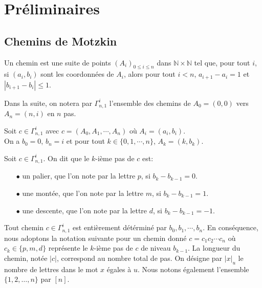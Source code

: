 \chapter{Préliminaires}
\section{Chemins de Motzkin}

\begin{definition}
	\begin{rm}
		Un chemin est une suite de points $(A_{i})_{0 \leq i \leq n}$ dans $\mathbb{N}\times \mathbb{N}$ tel que, pour tout $i$, si $
			(a_{i}, b_{i})$ sont les coordonnées de $A_{i}$, alors pour tout $i<n$, $a_{i+1} - a_{i}=1$ et $|b_{i+1} - b_{i}| \leq 1$.
	\end{rm}
\end{definition}
Dans la suite, on notera par $\Gamma_{n,1}^{i}$ l'ensemble des chemins de $A_{0} = (0,0)$ vers $A_{n} = (n,i)$ en $n$ pas.

\begin{property}
	Soit $c \in \Gamma_{n,1}^{i}$ avec $c=(A_{0},A_{1}, \cdots, A_{n})$ où $A_{i}=(a_{i}, b_{i})$.\\
	On a $b_{0}=0$, $b_{n}=i$ et pour tout $k \in \{0, 1, \cdots, n\}$, $A_{k} = (k, b_{k})$.
\end{property}

\begin{definition} \label{path_char}
	\begin{rm}
		Soit $c \in \Gamma_{n,1}^{i}$. On dit que le $k$-ième pas de $c$ est:
		\begin{itemize}
			\item[$\bullet$] un palier, que l'on note par la lettre $p$, si $b_{k}- b_{k-1} = 0$.
			\item[$\bullet$] une montée, que l'on note par la lettre $m$, si $b_{k}- b_{k-1} = 1$.
			\item[$\bullet$] une descente, que l'on note par la lettre $d$, si $b_{k}- b_{k-1} = -1$.
		\end{itemize}
	\end{rm}
\end{definition}
Tout chemin $c \in \Gamma_{n,1}^{i}$ est entièrement détérminé par $b_{0}, b_{1}, \cdots, b_{n}$.
En conséquence, nous adoptons la notation suivante pour un chemin donné
$c = c_{1}c_{2}\cdots c_{n}$ où \\$c_{k} \in \{p, m, d\}$ représente le $k$-ième pas de $c$ de niveau $b_{k-1}$. La longueur du chemin, notée $|c|$, correspond au nombre total de pas. On désigne par $|x|_{u}$ le nombre de lettres dans le mot $x$ égales à $u$. Nous notons également l'ensemble $\{1, 2, \ldots, n\}$ par $[n]$.

